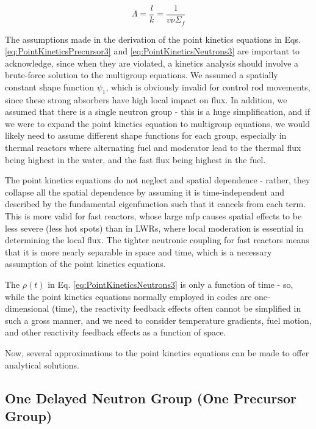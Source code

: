 \documentclass[10pt]{article}
\begin{document}
\begin{flushleft}
\begin{equation}
\label{eq:MeanNeutronGenerationTime}
\Lambda=\frac{l}{k}=\frac{1}{v\nu\Sigma_f}
\end{equation} 

The assumptions made in the derivation of the point kinetics equations in Eqs. \ref{eq:PointKineticsPrecursor3} and \ref{eq:PointKineticsNeutrons3} are important to acknowledge, since when they are violated, a kinetics analysis should involve a brute-force solution to the multigroup equations. We assumed a spatially constant shape function \(\psi_1\), which is obviously invalid for control rod movements, since these strong absorbers have high local impact on flux. In addition, we assumed that there is a single neutron group - this is a huge simplification, and if we were to expand the point kinetics equation to multigroup equations, we would likely need to assume different shape functions for each group, especially in thermal reactors where alternating fuel and moderator lead to the thermal flux being highest in the water, and the fast flux being highest in the fuel. 

The point kinetics equations do not neglect and spatial dependence - rather, they collapse all the spatial dependence by assuming it is time-independent and described by the fundamental eigenfunction such that it cancels from each term. This is more valid for fast reactors, whose large mfp causes spatial effects to be less severe (less hot spots) than in LWRs, where local moderation is essential in determining the local flux. The tighter neutronic coupling for fast reactors means that it is more nearly separable in space and time, which is a necessary assumption of the point kinetics equations. 

The \(\rho(t)\) in Eq. \ref{eq:PointKineticsNeutrons3} is only a function of time - so, while the point kinetics equations normally employed in codes are one-dimensional (time), the reactivity feedback effects often cannot be simplified in such a gross manner, and we need to consider temperature gradients, fuel motion, and other reactivity feedback effects as a function of space. 

Now, several approximations to the point kinetics equations can be made to offer analytical solutions.


\subsection{One Delayed Neutron Group (One Precursor Group)}


\end{flushleft}
\end{document}
